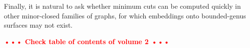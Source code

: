\documentclass[natbib]{svcyclop}
\def\NOTE#1{\textcolor{Red}{\textbf{\textsf{••• #1 •••}}}}
\begin{document}
Finally, it is natural to ask whether minimum cuts can be computed quickly in other minor-closed families of graphs, for which embeddings onto bounded-genus surfaces may not exist.



\CrossRef

\NOTE{Check table of contents of volume 2}


\nocite{bk-amfdp-09, hkrs-fspap-97, k-msspp-05, r-mstcp-83, insw-iamcmf-11, multishort, parshort, splitting, gohog, optcycles, surflow, surfcut, homcover, global, e-dgteg-03, c-scgsp-10, p-deeoc-13}


%

\end{document}
